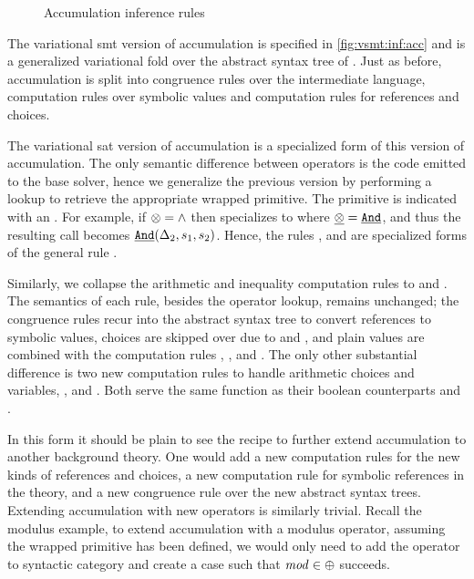 \label{section:vsmt:accumulation}
%
\begin{figure}
  
  \caption{Accumulation inference rules}%
  \label{fig:vsmt:inf:acc}
\end{figure}
%
%
The variational \ac{smt} version of accumulation is specified in
\autoref{fig:vsmt:inf:acc} and is a generalized variational fold over the
abstract syntax tree of \eIL{}. Just as before, accumulation is split into
congruence rules over the intermediate language, computation rules over symbolic
values and computation rules for references and choices.

The variational \ac{sat} version of accumulation is a specialized form of this
version of accumulation. The only semantic difference between operators is the
code emitted to the base solver, hence we generalize the previous version by
performing a lookup to retrieve the appropriate wrapped primitive. The primitive
is indicated with an . For example, if $\otimes{}{} = \wedge$
then \acBoolS{} specializes to \acAndS{} where $\underline{\otimes{}{}} =
\underline{\texttt{And}}$, and thus the resulting call becomes $\underline{\texttt{And}}(\Delta_{2},
s_1, s_2)$. Hence, the rules \acAndS{}, and \acOrS{} are specialized forms of
the general rule \acBoolS.

Similarly, we collapse the arithmetic and inequality computation rules to
\acArithS{} and \acInEqS{}. The semantics of each rule, besides the operator
lookup, remains unchanged; the congruence rules recur into the abstract syntax
tree to convert references to symbolic values, choices are skipped over due to
\acChc{} and \acChcI{}, and plain values are combined with the computation rules
\acBoolS, \acArithS, and \acInEqS.
%
The only other substantial difference is two new computation rules to handle
arithmetic choices and variables, \acChcI{}, and \acRefI{}. Both serve the same
function as their boolean counterparts \acChc{} and \acRef{}.

In this form it should be plain to see the recipe to further extend accumulation
to another background theory. One would add a new computation rules for the new
kinds of references and choices, a new computation rule for symbolic references
in the theory, and a new congruence rule over the new abstract syntax trees.
Extending accumulation with new operators is similarly trivial. Recall the
modulus example, to extend accumulation with a modulus operator, assuming the
wrapped primitive has been defined, we would only need to add the operator to
\integerFuncs{} syntactic category and create a case such that $\mathit{mod} \in
\oplus{}{}$ succeeds.



